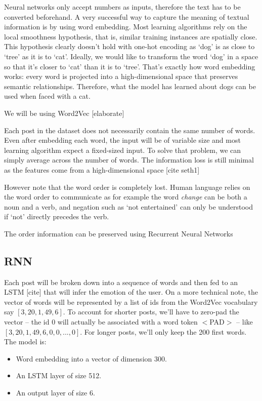 \documentclass{article} %
\begin{document}
Neural networks only accept numbers as inputs, therefore the text has to be converted beforehand. A very successful way to capture the meaning of textual information is by using word embedding. Most learning algorithms rely on the local smoothness hypothesis, that is, similar training instances are spatially close. This hypothesis clearly doesn't hold with one-hot encoding as `dog' is as close to `tree' as it is to `cat'. Ideally, we would like to transform the word `dog' in a space so that it's closer to `cat' than it is to `tree'. That's exactly how word embedding works: every word is projected into a high-dimensional space that preserves semantic relationships. Therefore, what the model has learned about dogs can be used when faced with a cat.

We will be using Word2Vec [elaborate]

Each post in the dataset does not necessarily contain the same number of words. Even after embedding each word, the input will be of variable size and most learning algorithm expect a fixed-sized input. To solve that problem, we can simply average across the number of words. The information loss is still minimal as the features come from a high-dimensional space [cite seth1]

However note that the word order is completely lost. Human language relies on the word order to communicate as for example the word {\em change} can be both a noun and a verb, and negation such as `not entertained' can only be understood if `not' directly precedes the verb.

The order information can be preserved using Recurrent Neural Networks

\subsection{RNN}
Each post will be broken down into a sequence of words and then fed to an LSTM [cite] that will infer the emotion of the user. On a more technical note, the vector of words will be represented by a list of ids from the Word2Vec vocabulary say $[3, 20, 1, 49, 6]$. To account for shorter posts, we'll have to zero-pad the vector -- the id 0 will actually be associated with a word token $<$PAD$>$ -- like $[3, 20, 1, 49, 6, 0, 0, ..., 0]$. For longer posts, we'll only keep the 200 first words. The model is:
\begin{itemize}
    \item Word embedding into a vector of dimension 300.
    \item An LSTM layer of size 512.
    \item An output layer of size 6.
\end{itemize}
\end{document}
